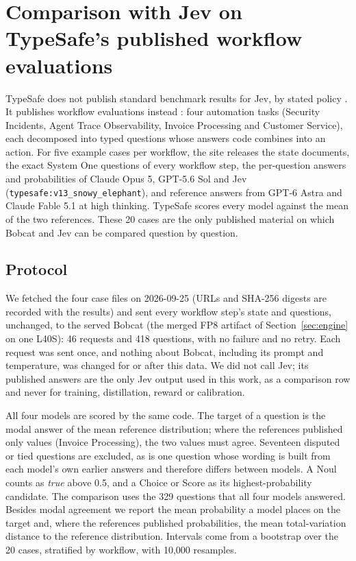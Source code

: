 \section{Comparison with Jev on TypeSafe's published workflow evaluations}
\label{sec:jev}

TypeSafe does not publish standard benchmark results for Jev, by stated policy
\citep{typesafe_antibench}. It publishes workflow evaluations instead \citep{typesafe_evals}:
four automation tasks (Security Incidents, Agent Trace Observability, Invoice Processing and
Customer Service), each decomposed into typed questions whose answers code combines into an
action. For five example cases per workflow, the site releases the state documents, the
exact System One questions of every workflow step, the per-question answers and
probabilities of Claude Opus 5, GPT-5.6 Sol and Jev (\texttt{typesafe:v13\_snowy\_elephant}),
and reference answers from GPT-6 Astra and Claude Fable 5.1 at high thinking. TypeSafe scores
every model against the mean of the two references. These 20 cases are the only published
material on which Bobcat and Jev can be compared question by question.

\subsection{Protocol}

We fetched the four case files on 2026-09-25 (URLs and SHA-256 digests are recorded with the
results) and sent every workflow step's state and questions, unchanged, to the served Bobcat
(the merged FP8 artifact of Section~\ref{sec:engine} on one L40S): 46 requests and 418
questions, with no failure and no retry. Each request was sent once, and nothing about
Bobcat, including its prompt and temperature, was changed for or after this data. We did not
call Jev; its published answers are the only Jev output used in this work, as a comparison
row and never for training, distillation, reward or calibration.

All four models are scored by the same code. The target of a question is the modal answer of
the mean reference distribution; where the references published only values (Invoice
Processing), the two values must agree. Seventeen disputed or tied questions are excluded,
as is one question whose wording is built from each model's own earlier answers and therefore
differs between models. A Noul counts as \emph{true} above 0.5, and a Choice or Score as its
highest-probability candidate. The comparison uses the 329 questions that all four models
answered. Besides modal agreement we report the mean probability a model places on the target
and, where the references published probabilities, the mean total-variation distance to the
reference distribution. Intervals come from a bootstrap over the 20 cases, stratified by
workflow, with 10,000 resamples.

